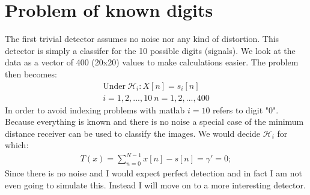 \documentclass[12pt]{article}
\begin{document}
\section{Problem of known digits}
	The first trivial detector assumes no noise nor any kind of distortion.
	This detector is simply a classifer for the 10 possible digits (signals).
	We look at the data as a vector of 400 (20x20) values to make calculations easier.
	The problem then becomes:
	\begin{gather*}
		\text{Under} \ \mathcal{H}_i: X[n] = s_i[n] \\
		i = 1,2,...,10 \ n=1,2,...,400
	\end{gather*}
	In order to avoid indexing problems with matlab $i = 10$ refers to digit "0".
	Because everything is known and there is no noise a special case of the minimum
		distance receiver can be used to classify the images.
	We would decide $\mathcal{H}_i$ for which:
	\begin{gather*}
		T(x) = \sum_{n=0}^{N-1}x[n]-s[n] = \gamma' = 0;
	\end{gather*}
	Since there is no noise and I would expect perfect detection and in fact I am not
		even going to simulate this.
	Instead I will move on to a more interesting detector.
	
	
\end{document}
